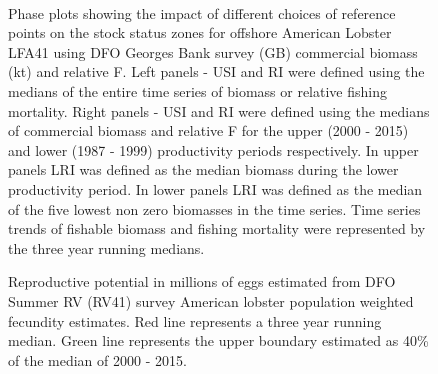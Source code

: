 \documentclass[11pt]{article}
\newcommand{\e}{/backup/bio_data/bio.lobster/figures/} %
\begin{document}
\begin{landscape}
\begin{figure}
\centering
         \\
     
      \caption{Phase plots showing the impact of different choices of reference points on the stock status zones for offshore American Lobster LFA41 using DFO Georges Bank survey (GB) commercial biomass (kt) and relative F. Left panels  - USI and RI were defined using the medians of the entire time series of biomass or relative fishing mortality. Right panels - USI and RI were defined using the medians of commercial biomass and relative F for the upper (2000 - 2015) and lower (1987 - 1999) productivity periods respectively. In upper panels LRI was defined as the median biomass during the lower productivity period. In lower panels LRI was defined as the median of the five lowest non zero biomasses in the time series. Time series trends of fishable biomass and fishing mortality were represented by the three year running medians. }


\end{figure}
\end{landscape}
     \clearpage

\begin{figure}

\centering
\caption{Reproductive potential in millions of eggs estimated from DFO Summer RV (RV41) survey American lobster population weighted fecundity estimates. Red line represents a three year running median. Green line represents the upper boundary estimated as 40\% of the median of 2000 - 2015. }
\end{figure}
\end{document}
